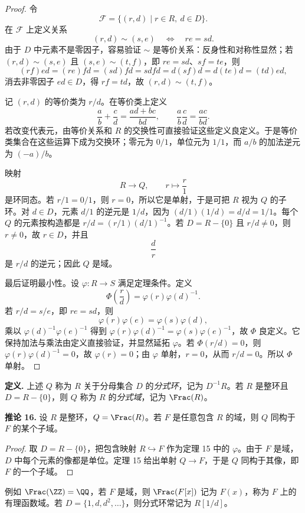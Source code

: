 \begin{proof}
令
\[
  \mathcal F=\{(r,d)\mid r\in R,
  \ d\in D\}.
\]
在 $\mathcal F$ 上定义关系
\[
  (r,d)\sim(s,e)
  \quad\Longleftrightarrow\quad re=sd.
\]
由于 $D$ 中元素不是零因子，容易验证 $\sim$ 是等价关系：反身性和对称性显然；若 $(r,d)\sim(s,e)$ 且 $(s,e)\sim(t,f)$，即 $re=sd$、$sf=te$，则
\[
  (rf)ed=(re)fd=(sd)fd=sdfd=d(sf)d=d(te)d=(td)ed,
\]
消去非零因子 $ed\in D$，得 $rf=td$，故 $(r,d)\sim(t,f)$。

记 $(r,d)$ 的等价类为 $r/d$。在等价类上定义
\[
  \frac ab+
  \frac cd=\frac{ad+bc}{bd},
  \qquad
  \frac ab\frac cd=\frac{ac}{bd}.
\]
若改变代表元，由等价关系和 $R$ 的交换性可直接验证这些定义良定义。于是等价类集合在这些运算下成为交换环；零元为 $0/1$，单位元为 $1/1$，而 $a/b$ 的加法逆元为 $(-a)/b$。

映射
\[
  R\longrightarrow Q,
  \qquad r\longmapsto \frac r1
\]
是环同态。若 $r/1=0/1$，则 $r=0$，所以它是单射，于是可把 $R$ 视为 $Q$ 的子环。对 $d\in D$，元素 $d/1$ 的逆元是 $1/d$，因为 $(d/1)(1/d)=d/d=1/1$。每个 $Q$ 的元素按构造都是 $r/d=(r/1)(d/1)^{-1}$。若 $D=R-\{0\}$ 且 $r/d\neq0$，则 $r\neq0$，故 $r\in D$，并且
\[
  \frac dr
\]
是 $r/d$ 的逆元；因此 $Q$ 是域。

最后证明最小性。设 $\varphi:R\to S$ 满足定理条件。定义
\[
  \Phi\!\left(\frac rd\right)=\varphi(r)\varphi(d)^{-1}.
\]
若 $r/d=s/e$，即 $re=sd$，则
\[
  \varphi(r)\varphi(e)=\varphi(s)\varphi(d),
\]
乘以 $\varphi(d)^{-1}\varphi(e)^{-1}$ 得到 $\varphi(r)\varphi(d)^{-1}=\varphi(s)\varphi(e)^{-1}$，故 $\Phi$ 良定义。它保持加法与乘法由定义直接验证，并显然延拓 $\varphi$。若 $\Phi(r/d)=0$，则 $\varphi(r)\varphi(d)^{-1}=0$，故 $\varphi(r)=0$；由 $\varphi$ 单射，$r=0$，从而 $r/d=0$。所以 $\Phi$ 单射。
\end{proof}

\medskip
\noindent\textbf{定义.} 上述 $Q$ 称为 $R$ 关于分母集合 $D$ 的\emph{分式环}，记为 $D^{-1}R$。若 $R$ 是整环且 $D=R-\{0\}$，则 $Q$ 称为 $R$ 的\emph{分式域}，记为 $\Frac(R)$。

\medskip
\noindent\textbf{推论 16.} 设 $R$ 是整环，$Q=\Frac(R)$。若 $F$ 是任意包含 $R$ 的域，则 $Q$ 同构于 $F$ 的某个子域。

\begin{proof}
取 $D=R-\{0\}$，把包含映射 $R\hookrightarrow F$ 作为定理 15 中的 $\varphi$。由于 $F$ 是域，$D$ 中每个元素的像都是单位。定理 15 给出单射 $Q\to F$，于是 $Q$ 同构于其像，即 $F$ 的一个子域。
\end{proof}

例如 $\Frac(\ZZ)=\QQ$，若 $F$ 是域，则 $\Frac(F[x])$ 记为 $F(x)$，称为 $F$ 上的有理函数域。若 $D=\{1,d,d^2,\ldots\}$，则分式环常记为 $R[1/d]$。

